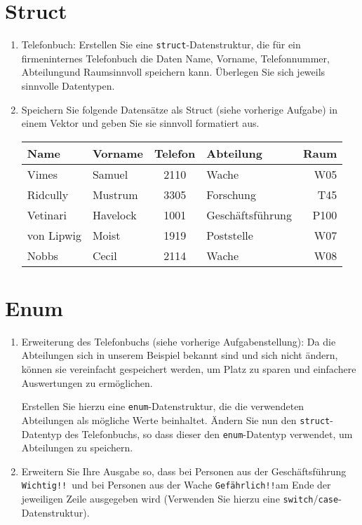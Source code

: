 \documentclass[paper=a4, fontsize=11pt, twoside]{scrartcl}
\begin{document}
\section*{Struct}
\begin{enumerate}[resume]
   \item Telefonbuch: Erstellen Sie eine \texttt{struct}-Datenstruktur, die für ein firmeninternes Telefonbuch die Daten \glqq Name\grqq, \glqq Vorname\grqq, \glqq Telefonnummer\grqq, \glqq Abteilung\grqq und \glqq Raum\grqq sinnvoll speichern kann. Überlegen Sie sich jeweils sinnvolle Datentypen.
   \item Speichern Sie folgende Datensätze als Struct (siehe vorherige Aufgabe) in einem Vektor und geben Sie sie sinnvoll formatiert aus.
\begin{table}[h!]
   \centering
   \begin{tabular}{llclr}
   Name & Vorname & Telefon & Abteilung & Raum \\    \hline 
   Vimes & Samuel & 2110 & Wache & W05 \\
   Ridcully & Mustrum  & 3305 & Forschung & T45 \\
   Vetinari & Havelock & 1001 & Geschäftsführung & P100 \\
   von Lipwig & Moist  & 1919 & Poststelle & W07 \\
   Nobbs & Cecil & 2114 & Wache & W08
   \end{tabular}
\end{table}
\end{enumerate}

\section*{Enum}
\begin{enumerate}[resume]
   \item Erweiterung des Telefonbuchs (siehe vorherige Aufgabenstellung): Da die Abteilungen sich in unserem Beispiel bekannt sind und sich nicht ändern, können sie vereinfacht gespeichert werden, um Platz zu sparen und einfachere Auswertungen zu ermöglichen. \par Erstellen Sie hierzu eine \texttt{enum}-Datenstruktur, die die verwendeten Abteilungen als mögliche Werte beinhaltet. Ändern Sie nun den \texttt{struct}-Datentyp des Telefonbuchs, so dass dieser den \texttt{enum}-Datentyp verwendet, um Abteilungen zu speichern.
   \item Erweitern Sie Ihre Ausgabe so, dass bei Personen aus der Geschäftsführung \glqq \texttt{Wichtig!!}\grqq\, und bei Personen aus der Wache \glqq \texttt{Gefährlich!!}\grqq am Ende der jeweiligen Zeile ausgegeben wird (Verwenden Sie hierzu eine \texttt{switch}/\texttt{case}-Datenstruktur).
\end{enumerate}
\end{document}
